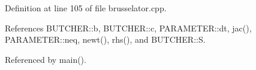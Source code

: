 Definition at line 105 of file brusselator.\+cpp.



References B\+U\+T\+C\+H\+E\+R\+::b, B\+U\+T\+C\+H\+E\+R\+::c, P\+A\+R\+A\+M\+E\+T\+E\+R\+::dt, jac(), P\+A\+R\+A\+M\+E\+T\+E\+R\+::neq, newt(), rhs(), and B\+U\+T\+C\+H\+E\+R\+::\+S.



Referenced by main().

